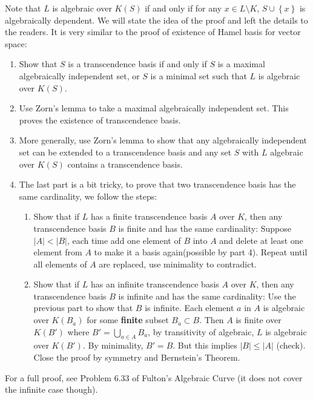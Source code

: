 \documentclass{note-eng}
\begin{document}
\begin{iproof}
    Note that $L$ is algebraic over $K(S)$ if and only if for any $x \in L \setminus K$, $S \cup \left\lbrace x \right\rbrace$ is algebraically dependent. We will state the idea of the proof and left the details to the readers. It is very similar to the proof of existence of Hamel basis for vector space:
    \begin{enumerate}
        \item Show that $S$ is a transcendence basis if and only if $S$ is a maximal algebraically independent set, or $S$ is a minimal set such that $L$ is algebraic over $K(S)$.
        \item Use Zorn's lemma to take a maximal algebraically independent set. This proves the existence of transcendence basis. 
        \item More generally, use Zorn's lemma to show that any algebraically independent set can be extended to a transcendence basis and any set $S$ with $L$ algebraic over $K(S)$ contains a transcendence basis.
        \item The last part is a bit tricky, to prove that two transcendence basis has the same cardinality, we follow the steps:
        \begin{enumerate}
            \item Show that if $L$ has a finite transcendence basis $A$ over $K$, then any transcendence basis $B$ is finite and has the same cardinality: Suppose $\left\lvert A \right\rvert \lt \left\lvert B \right\rvert$, each time add one element of $B$ into $A$ and delete at least one element from $A$ to make it a basis again(possible by part 4). Repeat until all elements of $A$ are replaced, use minimality to contradict.
            \item Show that if $L$ has an infinite transcendence basis $A$ over $K$, then any transcendence basis $B$ is infinite and has the same cardinality: Use the previous part to show that $B$ is infinite. Each element $a$ in $A$ is algebraic over $K(B_a)$ for some \textbf{finite} subset $B_a \subset B$. Then $A$ is finite over $K(B')$ where $B' = \bigcup\limits_{a \in A} B_a$, by transitivity of algebraic, $L$ is algebraic over $K(B')$. By minimality, $B' = B$. But this implies $\left\lvert B \right\rvert \le \left\lvert A \right\rvert$ (check). Close the proof by symmetry and Bernstein's Theorem.
        \end{enumerate}
    \end{enumerate}

    For a full proof, see Problem 6.33 of Fulton's Algebraic Curve (it does not cover the infinite case though).
\end{iproof}
\end{document}
